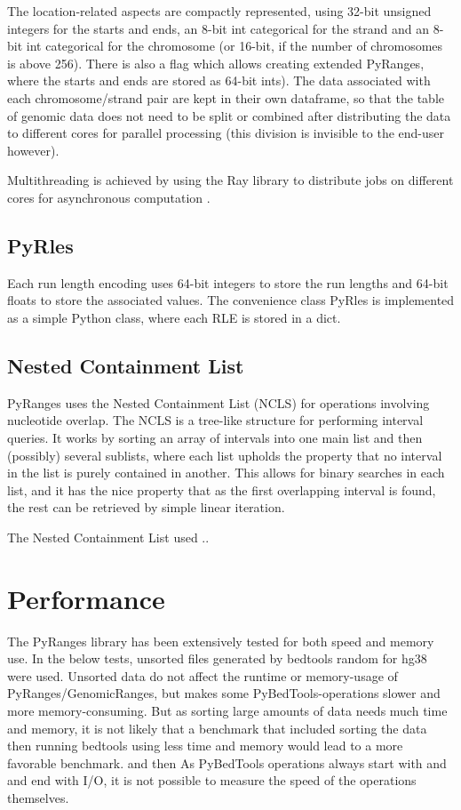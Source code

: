 \documentclass[10pt,letterpaper]{article}
\begin{document}
The location-related aspects are compactly represented, using 32-bit unsigned
integers for the starts and ends, an 8-bit int categorical for the strand and an
8-bit int categorical for the chromosome (or 16-bit, if the number of
chromosomes is above 256). There is also a flag which allows creating extended
PyRanges, where the starts and ends are stored as 64-bit ints). The data
associated with each chromosome/strand pair are kept in their own dataframe, so
that the table of genomic data does not need to be split or combined after
distributing the data to different cores for parallel processing (this division
is invisible to the end-user however).

Multithreading is achieved by using the Ray library to distribute jobs on
different cores for asynchronous computation \cite{}.

\subsection*{PyRles}

Each run length encoding uses 64-bit integers to store the run lengths and
64-bit floats to store the associated values. The convenience class PyRles is
implemented as a simple Python class, where each RLE is stored in a dict.

\subsection*{Nested Containment List}

PyRanges uses the Nested Containment
List\cite{doi:10.1093/bioinformatics/btl647} (NCLS) for operations involving
nucleotide overlap. The NCLS is a tree-like structure for performing interval
queries. It works by sorting an array of intervals into one main list and then
(possibly) several sublists, where each list upholds the property that no
interval in the list is purely contained in another. This allows for binary
searches in each list, and it has the nice property that as the first
overlapping interval is found, the rest can be retrieved by simple linear
iteration.

The Nested Containment List used ..

\section*{Performance}

The PyRanges library has been extensively tested for both speed and memory use.
In the below tests, unsorted files generated by bedtools random for hg38 were
used. Unsorted data do not affect the runtime or memory-usage of
PyRanges/GenomicRanges, but makes some PyBedTools-operations slower and more
memory-consuming. But as sorting large amounts of data needs much time and
memory, it is not likely that a benchmark that included sorting the data then
running bedtools using less time and memory would lead to a more favorable
benchmark. and then As PyBedTools operations always start with and and end with
I/O, it is not possible to measure the speed of the operations themselves.
\end{document}
